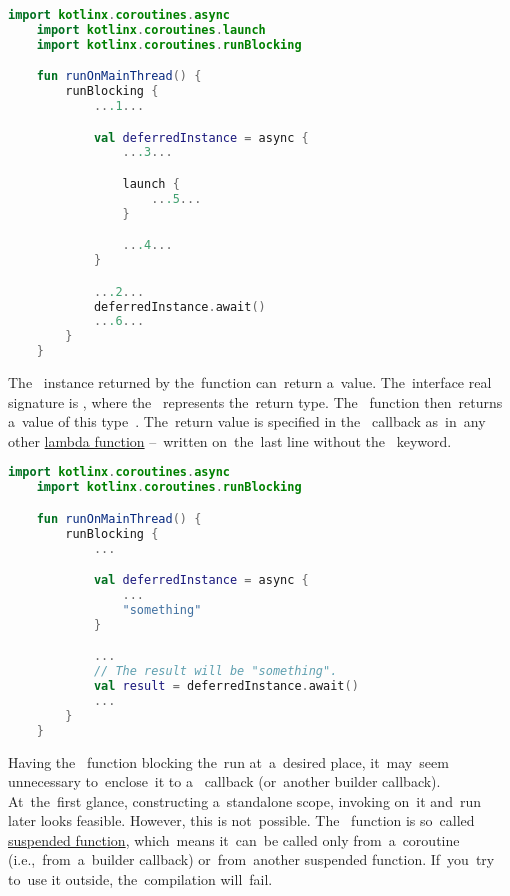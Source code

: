 \begin{lstlisting}[language=Kotlin, title={Numbers represent the~order of~execution}]
    import kotlinx.coroutines.async
    import kotlinx.coroutines.launch
    import kotlinx.coroutines.runBlocking

    fun runOnMainThread() {
        runBlocking {
            ...1...

            val deferredInstance = async {
                ...3...

                launch {
                    ...5...
                }

                ...4...
            }

            ...2...
            deferredInstance.await()
            ...6...
        }
    }
\end{lstlisting}
\newline

\noindent The~ instance returned by the~function  can~return a~value.
The~interface real signature is , where the~ represents the~return type.
The~ function then~returns a~value of this type~.
The~return value is specified in the~ callback as~in~any other \hyperref[kotlinlambda]{lambda function} --~written on~the~last line without the~ keyword.

\begin{lstlisting}[language=Kotlin]
    import kotlinx.coroutines.async
    import kotlinx.coroutines.runBlocking

    fun runOnMainThread() {
        runBlocking {
            ...

            val deferredInstance = async {
                ...
                "something"
            }

            ...
            // The result will be "something".
            val result = deferredInstance.await()
            ...
        }
    }
\end{lstlisting}
\newline

\warning Having the~ function blocking the~run at~a~desired place, it~may~seem unnecessary to~enclose~it to a~ callback (or~another builder callback).
At~the~first glance, constructing a~standalone scope, invoking  on~it and~run  later looks feasible.
However, this is not~possible.
The~ function is so~called \hyperref[kotlinsuspendfunction]{suspended function}, which~means it~can~be called only from~a~coroutine (i.e.,~from~a~builder callback) or~from~another suspended function.
If~you~try to~use it outside, the~compilation will~fail.

